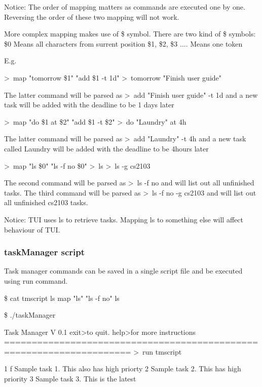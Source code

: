 \documentclass[12pt, a4paper]{article}
\begin{document}
Notice: The order of mapping matters as commands are executed one by one. Reversing the order of these two mapping will not work.

More complex mapping makes use of \$ symbol. There are two kind of \$ symbols:
    \$0 Means all characters from surrent position
    \$1, \$2, \$3 .... Means one token

E.g.
    
    \textgreater \ map "tomorrow \$1" "add \$1 -t 1d"
    \textgreater \ tomorrow "Finish user guide"
    
    The latter command will be parsed as
    \textgreater \ add "Finish user guide" -t 1d
    and a new task will be added with the deadline to be 1 days later

    \textgreater \ map "do \$1 at \$2" "add \$1 -t \$2"
    \textgreater \ do "Laundry" at 4h
    
    The latter command will be parsed as
    \textgreater \ add "Laundry" -t 4h
    and a new task called Laundry will be added with the deadline to be 4hours later

    \textgreater \ map "ls \$0" "ls -f no \$0"
    \textgreater \ ls
    \textgreater \ ls -g cs2103
    
    The second command will be parsed as
    \textgreater \ ls -f no 
    and will list out all unfinished tasks.
    The third command will be parsed as
    \textgreater \ ls -f no -g cs2103
    and will list out all unfinished cs2103 tasks.

Notice: TUI uses ls to retrieve tasks. Mapping ls to something else will affect behaviour of TUI.
    
\subsubsection{taskManager script}

Task manager commands can be saved in a single script file and be executed using run command.

    \$ cat tmscript 
    ls
    map "ls" "ls -f no"
    ls

    \$ ./taskManager

     Task Manager V 0.1 
     exit\textlessenter\textgreater to quit. help\textlessenter\textgreater for more instructions
    =====================================================================
    \textgreater \ run tmscript

    1 f Sample task 1. This also has high priorty
    2   Sample task 2. This has high priority
    3   Sample task 3. This is the latest
\end{document}

